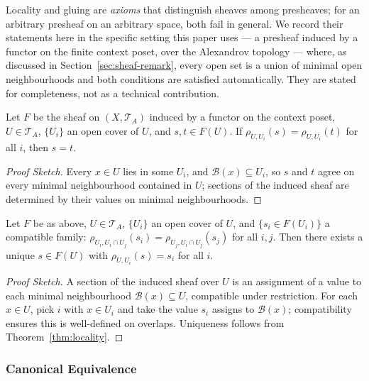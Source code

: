 Locality and gluing are \emph{axioms} that distinguish sheaves among
presheaves; for an arbitrary presheaf on an arbitrary space, both fail
in general. We record their statements here in the specific setting this
paper uses --- a presheaf induced by a functor on the finite context
poset, over the Alexandrov topology --- where, as discussed in
Section~\ref{sec:sheaf-remark}, every open set is a union of minimal
open neighbourhoods and both conditions are satisfied automatically.
They are stated for completeness, not as a technical contribution.

\begin{theorem}
\label{thm:locality}
Let $F$ be the sheaf on $(X, \mathcal{T}_A)$ induced by a functor on the
context poset, $U \in \mathcal{T}_A$, $\{U_i\}$ an open cover of $U$,
and $s, t \in F(U)$.
If $\rho_{U,U_i}(s) = \rho_{U,U_i}(t)$ for all $i$, then $s = t$.
\end{theorem}

\begin{proof}[Proof Sketch]
Every $x \in U$ lies in some $U_i$, and $\mathcal{B}(x) \subseteq U_i$,
so $s$ and $t$ agree on every minimal neighbourhood contained in $U$;
sections of the induced sheaf are determined by their values on minimal
neighbourhoods.
\end{proof}

\begin{theorem}
\label{thm:gluing}
Let $F$ be as above, $U \in \mathcal{T}_A$,
$\{U_i\}$ an open cover of $U$, and $\{s_i \in F(U_i)\}$ a compatible family:
$\rho_{U_i, U_i \cap U_j}(s_i) = \rho_{U_j, U_i \cap U_j}(s_j)$ for all $i,j$.
Then there exists a unique $s \in F(U)$ with $\rho_{U,U_i}(s) = s_i$ for all $i$.
\end{theorem}

\begin{proof}[Proof Sketch]
A section of the induced sheaf over $U$ is an assignment of a value to
each minimal neighbourhood $\mathcal{B}(x) \subseteq U$, compatible
under restriction. For each $x \in U$, pick $i$ with $x \in U_i$ and
take the value $s_i$ assigns to $\mathcal{B}(x)$; compatibility ensures
this is well-defined on overlaps. Uniqueness follows from
Theorem~\ref{thm:locality}.
\end{proof}

\subsubsection{Canonical Equivalence}


